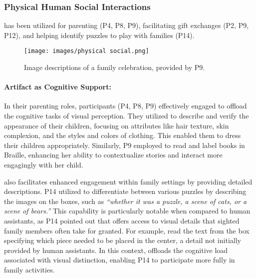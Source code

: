 \subsubsection{Physical Human Social Interactions}
\label{physical}

\bma{} has been utilized for parenting (P4, P8, P9), facilitating gift exchanges (P2, P9, P12), and helping identify puzzles to play with families (P14). 


\begin{figure}[t!]
\centering
\texttt{[image: images/physical social.png]}
\caption{Image descriptions of a family celebration, provided by P9.}
\end{figure}



\paragraph{Artifact as Cognitive Support:}
In their parenting roles, participants (P4, P8, P9) effectively engaged \bma{} to offload the cognitive tasks of visual perception. They utilized \bma{} to describe and verify the appearance of their children, focusing on attributes like hair texture, skin complexion, and the styles and colors of clothing. This enabled them to dress their children appropriately. 
Similarly, P9 employed \bma{} to read and label books in Braille, enhancing her ability to contextualize stories and interact more engagingly with her child. 



\bma{} also facilitates enhanced engagement within family settings by providing detailed descriptions. P14 utilized \bma{} to differentiate between various puzzles by describing the images on the boxes, such as \textit{``whether it was a puzzle, a scene of cats, or a scene of bears.''} This capability is particularly notable when compared to human assistants, as P14 pointed out that \bma{} offers access to visual details that sighted family members often take for granted. For example, \bma{} read the text from the box specifying which piece needed to be placed in the center, a detail not initially provided by human assistants. In this context, \bma{} offloads the cognitive load associated with visual distinction, enabling P14 to participate more fully in family activities.



